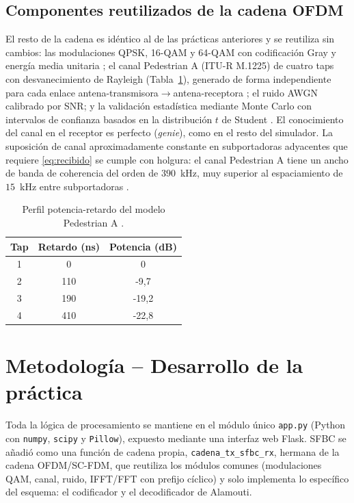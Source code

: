 \documentclass[conference,onecolumn]{IEEEtran}
\begin{document}
\subsection{Componentes reutilizados de la cadena OFDM}

El resto de la cadena es id\'entico al de las pr\'acticas anteriores y se reutiliza sin cambios: las modulaciones QPSK, 16-QAM y 64-QAM con codificaci\'on Gray y energ\'ia media unitaria \cite{proakis2008digital}; el canal Pedestrian A (ITU-R M.1225) de cuatro taps con desvanecimiento de Rayleigh (Tabla~\ref{tab:pedA}), generado de forma independiente para cada enlace antena-transmisora$\rightarrow$antena-receptora \cite{ituR1225,rappaport2002}; el ruido AWGN calibrado por SNR; y la validaci\'on estad\'istica mediante Monte Carlo con intervalos de confianza basados en la distribuci\'on $t$ de Student \cite{montgomery2011}. El conocimiento del canal en el receptor es perfecto (\textit{genie}), como en el resto del simulador. La suposici\'on de canal aproximadamente constante en subportadoras adyacentes que requiere \eqref{eq:recibido} se cumple con holgura: el canal Pedestrian A tiene un ancho de banda de coherencia del orden de $390$~kHz, muy superior al espaciamiento de $15$~kHz entre subportadoras \cite{cho2010mimo}.

\begin{table}[H]
    \renewcommand{\arraystretch}{1.2}
    \caption{Perfil potencia-retardo del modelo Pedestrian A \cite{ituR1225}.}
    \label{tab:pedA}
    \centering
    \begin{tabular}{ccc}
        \hline
        \textbf{Tap} & \textbf{Retardo (ns)} & \textbf{Potencia (dB)} \\
        \hline
        1 & 0   & 0       \\
        2 & 110 & -9{,}7  \\
        3 & 190 & -19{,}2 \\
        4 & 410 & -22{,}8 \\
        \hline
    \end{tabular}
\end{table}

\section{Metodolog\'ia -- Desarrollo de la pr\'actica}

Toda la l\'ogica de procesamiento se mantiene en el m\'odulo \'unico \texttt{app.py} (Python con \texttt{numpy}, \texttt{scipy} y \texttt{Pillow}), expuesto mediante una interfaz web Flask. SFBC se a\~nadi\'o como una funci\'on de cadena propia, \texttt{cadena\_tx\_sfbc\_rx}, hermana de la cadena OFDM/SC-FDM, que reutiliza los m\'odulos comunes (modulaciones QAM, canal, ruido, IFFT/FFT con prefijo c\'iclico) y solo implementa lo espec\'ifico del esquema: el codificador y el decodificador de Alamouti.
\end{document}
